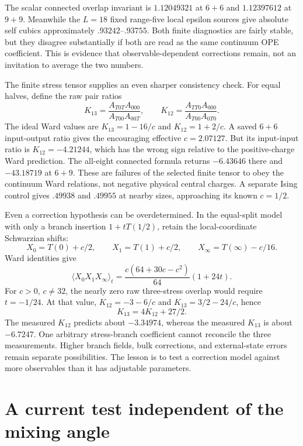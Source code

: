 \begin{numericalrecord}
The scalar connected overlap invariant is $1.12049321$ at $6+6$ and
$1.12397612$ at $9+9$. Meanwhile the $L=18$ fixed range-five local
epsilon sources give absolute self cubics approximately
$.93242$--$.93755$. Both finite diagnostics are fairly stable, but they
disagree substantially if both are read as the same continuum OPE
coefficient. This is evidence that observable-dependent corrections
remain, not an invitation to average the two numbers.
\end{numericalrecord}

The finite stress tensor supplies an even sharper consistency check.
For equal halves, define the raw pair ratios
\[
 K_{13}=\frac{A_{T0T}A_{000}}{A_{T00}A_{00T}},\qquad
 K_{12}=\frac{A_{TT0}A_{000}}{A_{T00}A_{0T0}}.
\]
The ideal Ward values are $K_{13}=1-16/c$ and
$K_{12}=1+2/c$. A saved $6+6$ input-output ratio gives the
encouraging effective $c=2.07127$. But its input-input ratio is
$K_{12}=-4.21244$, which has the wrong sign relative to the
positive-charge Ward prediction. The all-eight connected formula
returns $-6.43646$ there and $-43.18719$ at $6+9$. These are
failures of the selected finite tensor to obey the continuum Ward
relations, not negative physical central charges. A separate Ising
control gives $.49938$ and $.49955$ at nearby sizes, approaching
its known $c=1/2$.

Even a correction hypothesis can be overdetermined. In the
equal-split model with only a branch insertion $1+tT(1/2)$, retain
the local-coordinate Schwarzian shifts:
\[
 X_0=T(0)+c/2,\qquad X_1=T(1)+c/2,\qquad
 X_\infty=T(\infty)-c/16.
\]
Ward identities give
\[
 \langle X_0X_1X_\infty\rangle_t
 =\frac{c(64+30c-c^2)}{64}(1+24t).
\]
For $c>0$, $c\ne32$, the nearly zero raw three-stress overlap
would require $t=-1/24$. At that value,
$K_{12}=-3-6/c$ and $K_{13}=3/2-24/c$, hence
\[
 K_{13}=4K_{12}+27/2.
\]
The measured $K_{12}$ predicts about $-3.34974$, whereas the
measured $K_{13}$ is about $-6.7247$. One arbitrary stress-branch
coefficient cannot reconcile the three measurements. Higher branch
fields, bulk corrections, and external-state errors remain separate
possibilities. The lesson is to test a correction model against
more observables than it has adjustable parameters.

\section{A current test independent of the mixing angle}

